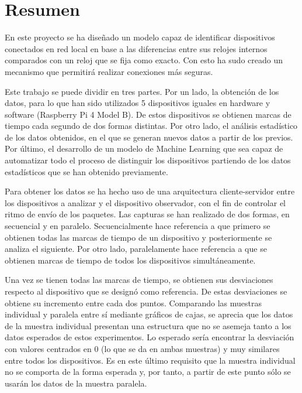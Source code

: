 
\chapter*{Resumen}
 \label{chap:resumen}

En este proyecto se ha diseñado un modelo capaz de identificar dispositivos conectados en red local en base a las diferencias entre sus relojes internos comparados con un reloj que se fija como exacto. Con esto ha sudo creado un mecanismo que permitirá realizar conexiones más seguras.

Este trabajo se puede dividir en tres partes. Por un lado, la obtención de los datos, para lo que han sido utilizados 5 dispositivos iguales en hardware y software (Raspberry Pi 4 Model B). De estos dispositivos se obtienen marcas de tiempo cada segundo de dos formas distintas. Por otro lado, el análisis estadístico de los datos obtenidos, en el que se generan nuevos datos a partir de los previos. Por último, el desarrollo de un modelo de Machine Learning que sea capaz de automatizar todo el proceso de distinguir los dispositivos partiendo de los datos estadísticos que se han obtenido previamente.

Para obtener los datos se ha hecho uso de una arquitectura cliente-servidor entre los dispositivos a analizar y el dispositivo observador, con el fin de controlar el ritmo de envío de los paquetes. Las capturas se han realizado de dos formas, en secuencial y en paralelo. Secuencialmente hace referencia a que primero se obtienen todas las marcas de tiempo de un dispositivo y posteriormente se analiza el siguiente. Por otro lado, paralelamente hace referencia a que se obtienen marcas de tiempo de todos los dispositivos simultáneamente.

Una vez se tienen todas las marcas de tiempo, se obtienen sus desviaciones respecto al dispositivo que se designó como referencia. De estas desviaciones se obtiene su incremento entre cada dos puntos. Comparando las muestras individual y paralela entre sí mediante gráficos de cajas, se aprecia que los datos de la muestra individual presentan una estructura que no se asemeja tanto a los datos esperados de estos experimentos. Lo esperado sería encontrar la desviación con valores centrados en 0 (lo que se da en ambas muestras) y muy similares entre todos los dispositivos. Es en este último requisito que la muestra individual no se comporta de la forma esperada y, por tanto, a partir de este punto sólo se usarán los datos de la muestra paralela.

